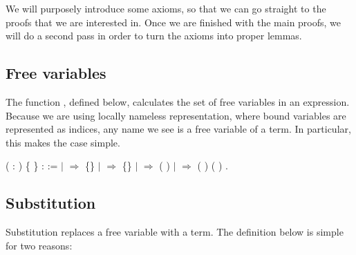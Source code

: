 \documentclass[12pt]{report}
\begin{document}
    We will purposely introduce some axioms, so that we can go straight
    to the proofs that we are interested in. Once we are finished with
    the main proofs, we will do a second pass in order to turn the 
    axioms into proper lemmas.
\begin{coqdoccode}
\coqdocemptyline
\end{coqdoccode}
\subsection{Free variables}



 The function , defined below, calculates the set of free
    variables in an expression.  Because we are using locally nameless
    representation, where bound variables are represented as indices,
    any name we see is a free variable of a term.  In particular, this
    makes the  case simple.
\begin{coqdoccode}
\coqdocemptyline
\coqdocnoindent
{}  ( : ) \{ \} :  :=\coqdoceol
\coqdocindent{1.00em}
  \coqdoceol
\coqdocindent{1.00em}
\ensuremath{|}      \ensuremath{\Rightarrow} \{\}\coqdoceol
\coqdocindent{1.00em}
\ensuremath{|}      \ensuremath{\Rightarrow} \{\}\coqdoceol
\coqdocindent{1.00em}
\ensuremath{|}      \ensuremath{\Rightarrow} ( )\coqdoceol
\coqdocindent{1.00em}
\ensuremath{|}    \ensuremath{\Rightarrow} ( )  ( )\coqdoceol
\coqdocindent{1.00em}
.\coqdoceol
\coqdocemptyline
\end{coqdoccode}
\subsection{Substitution}



 Substitution replaces a free variable with a term.  The definition
    below is simple for two reasons:
\end{document}
